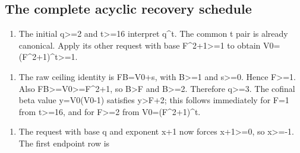 \subsection{The complete acyclic recovery schedule}



\begin{enumerate}

\item[1.] The initial q\textgreater{}\allowbreak{}=\allowbreak{}2 and t\textgreater{}\allowbreak{}=\allowbreak{}16 interpret q\textasciicircum{}\allowbreak{}t. The common t pair is already canonical. Apply its other request with base F\textasciicircum{}\allowbreak{}2+\allowbreak{}1\textgreater{}\allowbreak{}=\allowbreak{}1 to obtain V0=\allowbreak{}(F\textasciicircum{}\allowbreak{}2+\allowbreak{}1)\textasciicircum{}\allowbreak{}t\textgreater{}\allowbreak{}=\allowbreak{}1.

\end{enumerate}



\begin{enumerate}

\item[2.] The raw ceiling identity is F\textasteriskcentered{}\allowbreak{}B=\allowbreak{}V0+\allowbreak{}s, with B\textgreater{}\allowbreak{}=\allowbreak{}1 and s\textgreater{}\allowbreak{}=\allowbreak{}0. Hence F\textgreater{}\allowbreak{}=\allowbreak{}1. Also F\textasteriskcentered{}\allowbreak{}B\textgreater{}\allowbreak{}=\allowbreak{}V0\textgreater{}\allowbreak{}=\allowbreak{}F\textasciicircum{}\allowbreak{}2+\allowbreak{}1, so B\textgreater{}\allowbreak{}F and B\textgreater{}\allowbreak{}=\allowbreak{}2. Therefore q\textgreater{}\allowbreak{}=\allowbreak{}3. The cofinal beta value y=\allowbreak{}V0(V0-1) satisfies y\textgreater{}\allowbreak{}F+\allowbreak{}2; this follows immediately for F=\allowbreak{}1 from t\textgreater{}\allowbreak{}=\allowbreak{}16, and for F\textgreater{}\allowbreak{}=\allowbreak{}2 from V0=\allowbreak{}(F\textasciicircum{}\allowbreak{}2+\allowbreak{}1)\textasciicircum{}\allowbreak{}t.

\end{enumerate}



\begin{enumerate}

\item[3.] The request with base q and exponent x+\allowbreak{}1 now forces x+\allowbreak{}1\textgreater{}\allowbreak{}=\allowbreak{}0, so x\textgreater{}\allowbreak{}=\allowbreak{}-1. The first endpoint row is

\end{enumerate}



